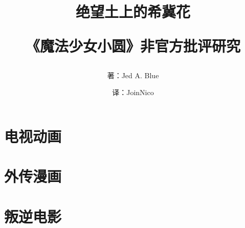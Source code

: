 \documentclass[12pt]{ctexbook}
\title{绝望土上的希冀花

《魔法少女小圆》非官方批评研究}
\author{著：Jed A. Blue \and 译：JoinNico}
\begin{document}
\maketitle
\newpage

\tableofcontents
\newpage

\frontmatter



\mainmatter
\part{电视动画}














\part{外传漫画}





\part{叛逆电影}








\backmatter

\end{document}

